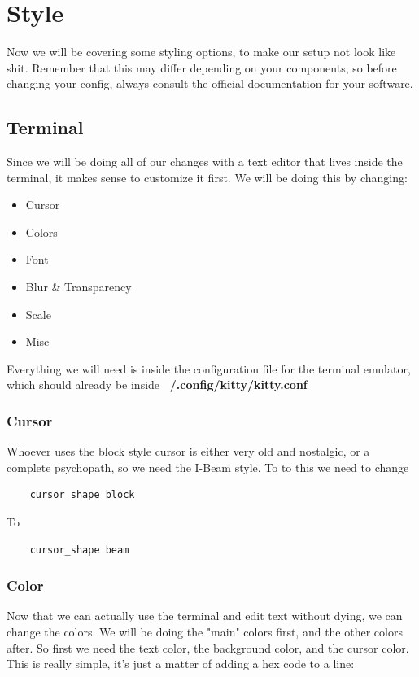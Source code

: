 \chapter{Style}
Now we will be covering some styling options, to make our setup not look like shit. Remember that this may differ depending on your components, so before changing your config, always consult the official documentation for your software.

\section{Terminal}
Since we will be doing all of our changes with a text editor that lives inside the terminal, it makes sense to customize it first. 
We will be doing this by changing:
\begin{itemize}
    \item Cursor
    \item Colors
    \item Font
    \item Blur \& Transparency
    \item Scale
    \item Misc
\end{itemize}

Everything we will need is inside the configuration file for the terminal emulator, which should already be inside \textbf{~/.config/kitty/kitty.conf}

\subsection{Cursor}
Whoever uses the block style cursor is either very old and nostalgic, or a complete psychopath, so we need the I-Beam style.
To to this we need to change
\begin{lstlisting}
    cursor_shape block
\end{lstlisting}
To
\begin{lstlisting}
    cursor_shape beam
\end{lstlisting}

\subsection{Color}
Now that we can actually use the terminal and edit text without dying, we can change the colors. We will be doing the "main" colors first, and the other colors after. So first we need the text color, the background color, and the cursor color.
This is really simple, it's just a matter of adding a hex code to a line:
